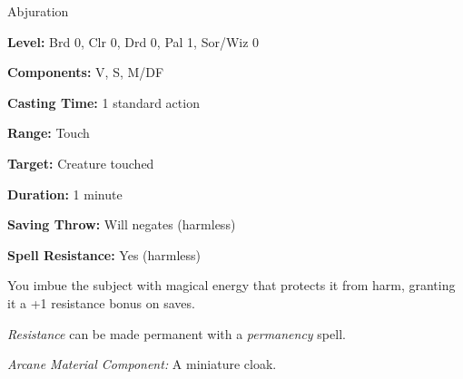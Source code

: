 
Abjuration

\textbf{Level:} Brd 0, Clr 0, Drd 0, Pal 1, Sor/Wiz 0

\textbf{Components:} V, S, M/DF

\textbf{Casting Time:} 1 standard action

\textbf{Range:} Touch

\textbf{Target:} Creature touched

\textbf{Duration:} 1 minute

\textbf{Saving Throw:} Will negates (harmless)

\textbf{Spell Resistance:} Yes (harmless)

You imbue the subject with magical energy that protects it from harm, granting 
it a +1 resistance bonus on saves.

\textit{Resistance} can be made permanent with a \textit{permanency} spell.

\textit{Arcane Material Component:} A miniature cloak.

